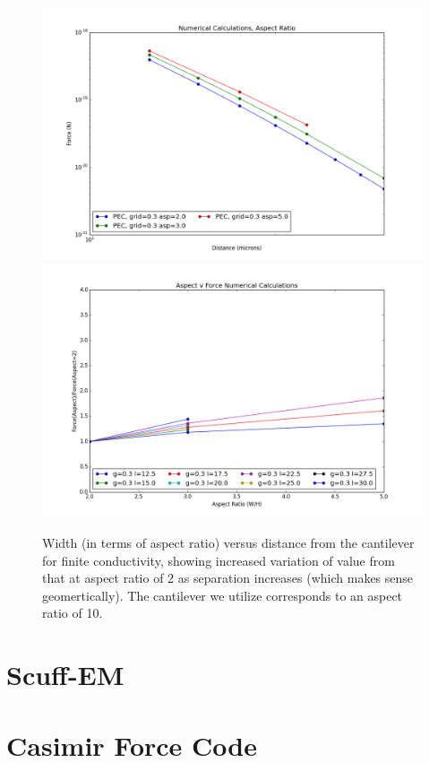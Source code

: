 \documentclass[11pt]{article}
\begin{document}
\begin{figure}[h]
\centering
\includegraphics[width=5in]{force_v_aspect_finite}
\includegraphics[width=5in]{aspect_correction_finite}
\caption{Width (in terms of aspect ratio) versus distance from the cantilever for finite conductivity, showing increased variation of value from that at aspect ratio of 2 as separation increases (which makes sense geomertically). The cantilever we utilize corresponds to an aspect ratio of 10.}\label{fig:aspectFinite}
\end{figure}

\pagebreak
\appendix
\section{Scuff-EM}
\section{Casimir Force Code}



\end{document}
